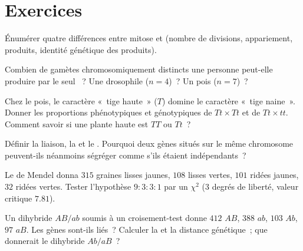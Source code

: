 \section{Exercices}

\begin{exercise}[$\star$]\label{exo:b2:meiosis-heredity:1}
Énumérer quatre différences entre mitose et  (nombre de
divisions, appariement, produits, identité génétique des produits).
\end{exercise}

\begin{exercise}[$\star$]\label{exo:b2:meiosis-heredity:2}
Combien de gamètes chromosomiquement distincts une personne peut-elle
produire par le seul ~? Une drosophile ($n = 4$)~? Un pois ($n =
7$)~?
\end{exercise}

\begin{exercise}[$\star$]\label{exo:b2:meiosis-heredity:3}
Chez le pois, le caractère «~tige haute~» ($T$) domine le caractère
«~tige naine~». Donner les proportions phénotypiques et génotypiques de
$Tt \times Tt$ et de $Tt \times tt$. Comment savoir si une plante haute
est $TT$ ou $Tt$~?
\end{exercise}

\begin{exercise}[$\star$]\label{exo:b2:meiosis-heredity:4}
Définir la liaison, la  et le .
Pourquoi deux gènes situés sur le même chromosome peuvent-ils néanmoins
ségréger comme s'ils étaient indépendants~?
\end{exercise}

\begin{exercise}[$\star\star$]\label{exo:b2:meiosis-heredity:5}
Le  de Mendel donna $315$ graines lisses
jaunes, $108$ lisses vertes, $101$ ridées jaunes, $32$ ridées vertes.
Tester l'hypothèse $9 : 3 : 3 :
1$ par un $\chi^2$ (3 degrés de liberté, valeur critique
$7.81$).
\end{exercise}

\begin{exercise}[$\star\star$]\label{exo:b2:meiosis-heredity:6}
Un dihybride $AB/ab$ soumis à un croisement-test donne $412$ $AB$,
$388$ $ab$, $103$
$Ab$, $97$ $aB$. Les gènes sont-ils liés~? Calculer la  et la distance génétique~; que donnerait le dihybride $Ab/aB$~?
\end{exercise}

